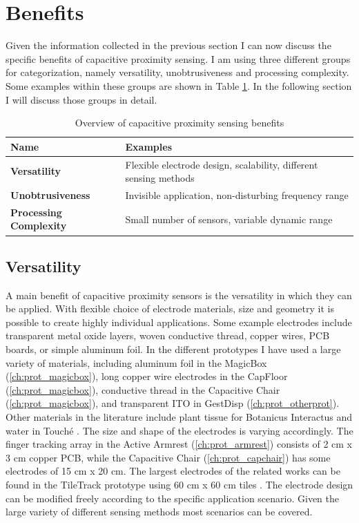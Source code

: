 \section{Benefits}
Given the information collected in the previous section I can now discuss the specific benefits of capacitive proximity sensing. I am using three different groups for categorization, namely versatility, unobtrusiveness and processing complexity. Some examples within these groups are shown in Table \ref{tab:cap_benefits}. In the following section I will discuss those groups in detail.

\begin{table}[htbp]
  \centering
  \caption{Overview of capacitive proximity sensing benefits}
    \begin{tabular}{p{4cm}p{6cm}}
    \toprule
    \textbf{Name} & \textbf{Examples} \\
    \midrule
    \textbf{Versatility} & Flexible electrode design, scalability, different sensing methods \\
    \textbf{Unobtrusiveness} & Invisible application, non-disturbing frequency range \\
    \textbf{Processing Complexity} & Small number of sensors, variable dynamic range \\
    \bottomrule
    \end{tabular}%
  \label{tab:cap_benefits}%
\end{table}%

\subsection{Versatility}
A main benefit of capacitive proximity sensors is the versatility in which they can be applied. With flexible choice of electrode materials, size and geometry it is possible to create highly individual applications. Some example electrodes include transparent metal oxide layers, woven conductive thread, copper wires, PCB boards, or simple aluminum foil. In the different prototypes I have used a large variety of materials, including aluminum foil in the MagicBox (\ref{ch:prot_magicbox}), long copper wire electrodes in the CapFloor (\ref{ch:prot_magicbox}), conductive thread in the Capacitive Chair (\ref{ch:prot_magicbox}), and transparent ITO in GestDisp (\ref{ch:prot_otherprot}). Other materials in the literature include plant tissue for Botanicus Interactus \cite{poupyrev2012botanicus} and water in Touché \cite{Sato2012}. The size and shape of the electrodes is varying accordingly. The finger tracking array in the Active Armrest (\ref{ch:prot_armrest}) consists of 2 cm x 3 cm copper PCB, while the Capacitive  Chair (\ref{ch:prot_capchair}) has some electrodes of 15 cm x 20 cm. The largest electrodes of the related works can be found in the TileTrack prototype using 60 cm x 60 cm tiles \cite{valtonen2010human}. The electrode design can be modified freely according to the specific application scenario. Given the large variety of different sensing methods most scenarios can be covered.

